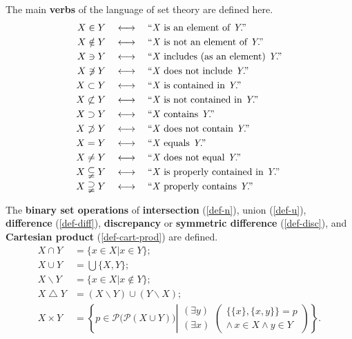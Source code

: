 \documentclass[letterpaper]{article}
\begin{document}
\begin{definition}
The main \textbf{verbs} of the language of set theory are defined here. 
\begin{align}
X\in Y \quad&\longleftrightarrow\quad \textrm{``\textit{X} is an element of \textit{Y}.''}\\
X\notin Y \quad&\longleftrightarrow\quad \textrm{``\textit{X} is not an element of \textit{Y}.''}\\
X\ni Y \quad&\longleftrightarrow\quad \textrm{``\textit{X} includes (as an element) \textit{Y}.''}\\
X\not\ni Y \quad&\longleftrightarrow\quad \textrm{``\textit{X} does not include \textit{Y}.''}\\
X\subset Y \quad&\longleftrightarrow\quad \textrm{``\textit{X} is contained in \textit{Y}.''}\\
X\not\subset Y \quad&\longleftrightarrow\quad \textrm{``\textit{X} is not contained in \textit{Y}.''}\\
X\supset Y \quad&\longleftrightarrow\quad \textrm{``\textit{X} contains \textit{Y}.''}\\
X\not\supset Y \quad&\longleftrightarrow\quad \textrm{``\textit{X} does not contain \textit{Y}.''}\\
X=Y \quad&\longleftrightarrow\quad \textrm{``\textit{X} equals \textit{Y}.''}\\
X\ne Y \quad&\longleftrightarrow\quad \textrm{``\textit{X} does not equal \textit{Y}.''}\\
X\subsetneqq Y \quad&\longleftrightarrow\quad \textrm{``\textit{X} is properly contained in \textit{Y}.''}\\
X\supsetneqq Y \quad&\longleftrightarrow\quad \textrm{``\textit{X} properly contains \textit{Y}.''}
\end{align}
\end{definition}
\begin{definition}
The \textbf{binary set operations} of \textbf{intersection} (\ref{def-n}), union (\ref{def-u}), \textbf{difference} (\ref{def-diff}), \textbf{discrepancy} or \textbf{symmetric difference} (\ref{def-disc}), and \textbf{Cartesian product} (\ref{def-cart-prod}) are defined.
\begin{align}
	X\cap Y&=\{x\in X|x\in Y\};\label{def-n}\\
	X\cup Y&=\bigcup\{X,Y\};\label{def-u}\\
	X\operatorname{\backslash}Y&=\{x\in X|x\notin Y\};\label{def-diff}\\
	X\operatorname{\triangle}Y&=(X\operatorname{\backslash}Y)\cup(Y\operatorname{\backslash}X);\label{def-disc}\\
	X\times Y
	&=
	\left\{
		p\in\mathscr P\big(\mathscr P(X\cup Y)\big)
		\left|
			\begin{array}{r}(\exists y)\\(\exists x)\end{array}\left(\begin{array}{r}\big\{\{x\},\{x,y\}\big\}=p\\\land\, x\in X \land y\in Y\end{array}\right)
		\right.
	\right\}.\label{def-cart-prod}
\end{align}
\end{definition}
\end{document}
